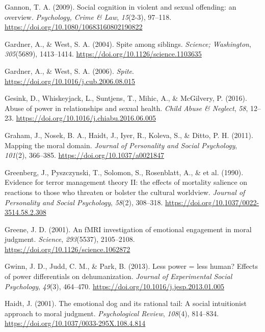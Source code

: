\documentclass[
  english,
  donotrepeattitle,doc, 12pt, a4paper,floatsintext]{apa7}
\newlength{\cslhangindent}
\newlength{\cslentryspacingunit} %
\newenvironment{CSLReferences}[2] %
 {%
  \setlength{\parindent}{0pt}
  \ifodd #1
  \let\oldpar\par
  \def\par{\hangindent=\cslhangindent\oldpar}
  \fi
  \setlength{\parskip}{#2\cslentryspacingunit}
 }%
 {}
\begin{document}
\begin{CSLReferences}{1}{0}
\leavevmode{}%
Gannon, T. A. (2009). Social cognition in violent and sexual offending: an overview. \emph{Psychology, Crime \& Law}, \emph{15}(2-3), 97--118. \url{https://doi.org/10.1080/10683160802190822}

\leavevmode{}%
Gardner, A., \& West, S. A. (2004). Spite among siblings. \emph{Science; Washington}, \emph{305}(5689), 1413--1414. \url{https://doi.org/10.1126/science.1103635}

\leavevmode{}%
Gardner, A., \& West, S. A. (2006). \emph{Spite}. \url{https://doi.org/10.1016/j.cub.2006.08.015}

\leavevmode{}%
Gesink, D., Whiskeyjack, L., Suntjens, T., Mihic, A., \& McGilvery, P. (2016). Abuse of power in relationships and sexual health. \emph{Child Abuse \& Neglect}, \emph{58}, 12--23. \url{https://doi.org/10.1016/j.chiabu.2016.06.005}

\leavevmode{}%
Graham, J., Nosek, B. A., Haidt, J., Iyer, R., Koleva, S., \& Ditto, P. H. (2011). Mapping the moral domain. \emph{Journal of Personality and Social Psychology}, \emph{101}(2), 366--385. \url{https://doi.org/10.1037/a0021847}

\leavevmode{}%
Greenberg, J., Pyszczynski, T., Solomon, S., Rosenblatt, A., \& et al. (1990). Evidence for terror management theory II: the effects of mortality salience on reactions to those who threaten or bolster the cultural worldview. \emph{Journal of Personality and Social Psychology}, \emph{58}(2), 308--318. \url{https://doi.org/10.1037/0022-3514.58.2.308}

\leavevmode{}%
Greene, J. D. (2001). An fMRI investigation of emotional engagement in moral judgment. \emph{Science}, \emph{293}(5537), 2105--2108. \url{https://doi.org/10.1126/science.1062872}

\leavevmode{}%
Gwinn, J. D., Judd, C. M., \& Park, B. (2013). Less power = less human? Effects of power differentials on dehumanization. \emph{Journal of Experimental Social Psychology}, \emph{49}(3), 464--470. \url{https://doi.org/10.1016/j.jesp.2013.01.005}

\leavevmode{}%
Haidt, J. (2001). The emotional dog and its rational tail: A social intuitionist approach to moral judgment. \emph{Psychological Review}, \emph{108}(4), 814--834. \url{https://doi.org/10.1037/0033-295X.108.4.814}


\end{CSLReferences}
\end{document}
